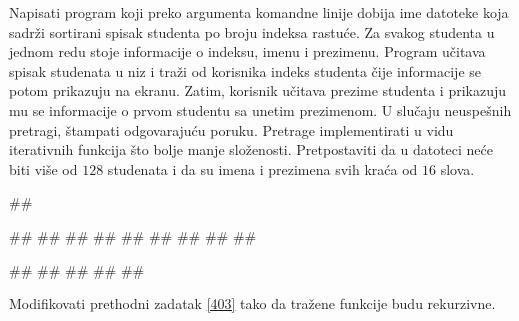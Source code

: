 \begin{Answer}[ref=402]
\end{Answer}
\begin{Exercise}[label=403]
  Napisati program koji preko argumenta komandne linije dobija ime
  datoteke koja sadrži sortirani spisak studenta po broju indeksa
  rastuće. Za svakog studenta u jednom redu stoje informacije o
  indeksu, imenu i prezimenu.  Program učitava spisak studenata u niz
  i traži od korisnika indeks studenta čije informacije se potom
  prikazuju na ekranu.  Zatim, korisnik učitava prezime studenta i
  prikazuju mu se informacije o prvom studentu sa unetim prezimenom.
  U slučaju neuspešnih pretragi, štampati odgovarajuću
  poruku. Pretrage implementirati u vidu iterativnih funkcija što
  bolje manje složenosti. Pretpostaviti da u datoteci neće biti više
  od $128$ studenata i da su imena i prezimena svih kraća od $16$
  slova.
  
\begin{maxitest}
\begin{upotreba}{1}
##
  
##
##
##
##
##
##
##
##
##
  
#\naslovInt#
##
##
##
##
\end{upotreba}
\end{maxitest}


\end{Exercise}

\begin{Answer}[ref=403]
\end{Answer}
\begin{Exercise}[label=404]
  Modifikovati prethodni zadatak \ref{403} tako da tražene funkcije
  budu rekurzivne.


\end{Exercise}

